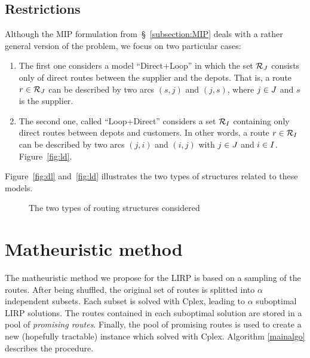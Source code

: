 \documentclass[a4paper,10pt]{article}
\begin{document}
\begin{linenumbers}
\subsection{Restrictions}
Although the MIP formulation from~\S~\ref{subsection:MIP} deals with a rather general version of the problem, we focus on two particular cases:
\begin{enumerate}
    \item The first one considers a model ``Direct+Loop'' in which the set $\mathcal{R}_J$ consists only of direct routes between the supplier and the depots. 
        That is, a route $r\in\mathcal{R}_J$ can be described by two arcs $(s,j)$ and $(j,s)$, where $j\in J$ and $s$ is the supplier.
    \item The second one, called ``Loop+Direct'' considers a set $\mathcal{R}_I$ containing only direct routes between depots and customers. 
        In other words, a route $r\in\mathcal{R}_I$ can be described by two arcs $(j,i)$ and $(i,j)$ with $j\in J$ and $i\in I$. Figure~\ref{fig:ld}.
\end{enumerate}
Figure~\ref{fig:dl} and~\ref{fig:ld} illustrates the two types of structures related to these models.
\begin{figure}
    \centering
    \caption{The two types of routing structures considered}
\end{figure}


\section{Matheuristic method} 
\label{sec:algo}

The matheuristic method we propose for the LIRP is based on a sampling of the routes. 
After being shuffled, the original set of routes is splitted into $\alpha$ independent subsets. 
Each subset is solved with Cplex, leading to $\alpha$ suboptimal LIRP solutions.  
The routes contained in each suboptimal solution are stored in a pool of \textit{promising routes}. 
Finally, the pool of promising routes is used to create a new (hopefully tractable) instance which solved with Cplex. 
Algorithm \ref{mainalgo} describes the procedure.



\end{linenumbers}
\end{document}
